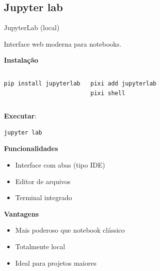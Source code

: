 \documentclass{beamer}
\begin{document}
\subsection{Jupyter lab}
\begin{frame}[fragile]{JupyterLab (local)}
    
    Interface web moderna para notebooks.
    
    \vspace{0.3cm}
    
    \textbf{Instalação}
    
    \begin{columns}[t]
        \begin{verbatim}
pip install jupyterlab
        \end{verbatim}
        \begin{verbatim}
pixi add jupyterlab
pixi shell
        \end{verbatim}
    \end{columns}
    
    
    \textbf{Executar}:
    
    \begin{verbatim}
jupyter lab
    \end{verbatim}
    
    \vspace{0.3cm}
    
    \textbf{Funcionalidades}
    
    \begin{itemize}
        \item Interface com abas (tipo IDE)
        \item Editor de arquivos
        \item Terminal integrado
    \end{itemize}
    
    \vspace{0.3cm}
    
    \textbf{Vantagens}
    
    \begin{itemize}
        \item Mais poderoso que notebook clássico
        \item Totalmente local
        \item Ideal para projetos maiores
    \end{itemize}
    
\end{frame}
\end{document}
